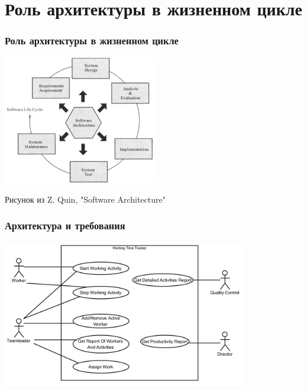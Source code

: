 \documentclass[xetex,mathserif,serif]{beamer}
\begin{document}
	\section{Роль архитектуры в жизненном цикле}

	\begin{frame}
		\frametitle{Роль архитектуры в жизненном цикле}
		\begin{center}
			\includegraphics[width=0.5\textwidth]{architectureLifeCycle.png}

			\begin{tiny}
				Рисунок из Z. Quin, "Software Architecture"
			\end{tiny}
		\end{center}
	\end{frame}

	\begin{frame}
		\frametitle{Архитектура и требования}
		\begin{center}
			\includegraphics[width=0.8\textwidth]{useCaseDiagram.png}
		\end{center}
	\end{frame}
\end{document}
